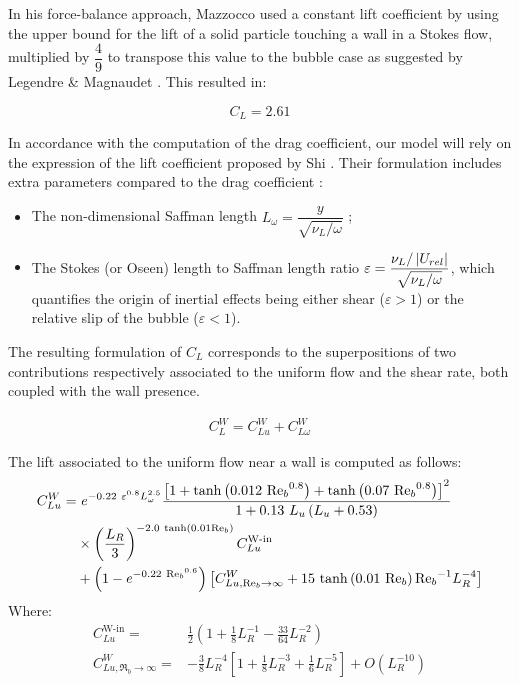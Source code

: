 \npar

In his force-balance approach, Mazzocco \etal \cite{mazzocco_reassessed_2018} used a constant lift coefficient by using the upper bound for the lift of a solid particle touching a wall in a Stokes flow, multiplied by $\dfrac{4}{9}$ to transpose this value to the bubble case as suggested by Legendre \& Magnaudet \cite{legendre_lift_1997_coeff}. This resulted in:

\begin{equation}
C_{L} = 2.61
\end{equation}


\npar

In accordance with the computation of the drag coefficient, our model will rely on the expression of the lift coefficient proposed by Shi \etal \cite{shi_drag_2021}. Their formulation includes extra parameters compared to the drag coefficient :
\begin{itemize}
\item The non-dimensional Saffman length $L_{\omega} = \dfrac{y}{\sqrt{\nu_{L} / \omega}}$ ;
\item The Stokes (or Oseen) length to Saffman length ratio $\varepsilon = \dfrac{\nu_{L} / \left| U_{rel} \right|}{\sqrt{\nu_{L} / \omega}}$, which quantifies the origin of inertial effects being either shear ($\varepsilon >1$) or the relative slip of the bubble ($\varepsilon < 1$).

\end{itemize}  

The resulting formulation of $C_{L}$ corresponds to the superpositions of two contributions respectively associated to the uniform flow and the shear rate, both coupled with the wall presence. 

\begin{align}
C_{L}^{W} =C_{Lu}^{W} + C_{L\omega}^{W}
\label{eq:lift_shi}
\end{align}



The lift associated to the uniform flow near a wall is computed as follows:
\begin{align}
\nonumber C_{Lu}^{W} =&\  e^{-0.22\ \varepsilon^{0.8}L_{\omega}^{2.5}} \frac{ \crocht{1 + \tanh{0.012\ {\Re_{b}}^{0.8}} + \tanh{0.07\ {\Re_{b}}^{0.8}} }^{2} } {1+0.13\ L_{u} \parth{L_{u}+0.53} } \\
%
\nonumber			&\times  \parth{\frac{L_{R}}{3}}^{-2.0\ \tanh{0.01\Re_{b}}}  C_{Lu}^{\text{W-in}}\\
%
&+\parth{1-e^{-0.22\ {\Re_{b}}^{0.6}} } \crocht{ C_{Lu,\Re_{b}\to \infty}^{W} + 15\ \tanh{ 0.01\ \Re_{b} }{\Re_{b}}^{-1} L_{R}^{-4} }
%
\end{align}
Where:
\begin{align}
C_{Lu}^{\text{W-in}}=&\frac{1}{2}\left(1+\frac{1}{8}L_{R}^{-1}-\frac{33}{64}L_{R}^{-2}\right)\\
%
C_{Lu, \Re_{b} \to \infty}^{W} = & -\frac{3}{8}L_{R}^{-4}\left[1+\frac{1}{8}L_{R}^{-3}+\frac{1}{6}L_{R}^{-5}\right] + O\left(L_{R}^{-10}\right)
\end{align}


